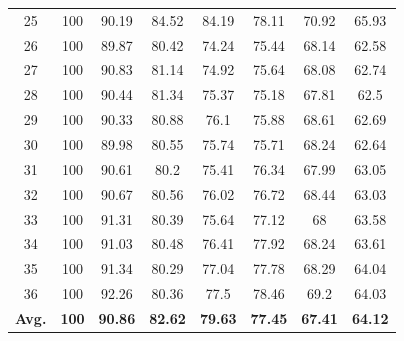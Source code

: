 \documentclass[review]{elsarticle}
\begin{document}
\begin{longtable}{c|ccccccc}
		25&100&90.19&84.52&84.19&78.11&70.92&65.93\\
		26&100&89.87&80.42&74.24&75.44&68.14&62.58\\
		27&100&90.83&81.14&74.92&75.64&68.08&62.74\\
		28&100&90.44&81.34&75.37&75.18&67.81&62.5\\
		29&100&90.33&80.88&76.1&75.88&68.61&62.69\\
		30&100&89.98&80.55&75.74&75.71&68.24&62.64\\
		31&100&90.61&80.2&75.41&76.34&67.99&63.05\\
		32&100&90.67&80.56&76.02&76.72&68.44&63.03\\
		33&100&91.31&80.39&75.64&77.12&68&63.58\\
		34&100&91.03&80.48&76.41&77.92&68.24&63.61\\
		35&100&91.34&80.29&77.04&77.78&68.29&64.04\\
		36&100&92.26&80.36&77.5&78.46&69.2&64.03\\
		\hline
		\textbf{Avg.}&\textbf{100}&\textbf{90.86}&\textbf{82.62}&\textbf{79.63}&\textbf{77.45}&\textbf{67.41}&\textbf{64.12}\\
		\hline\hline
\end{longtable}
\end{document}
